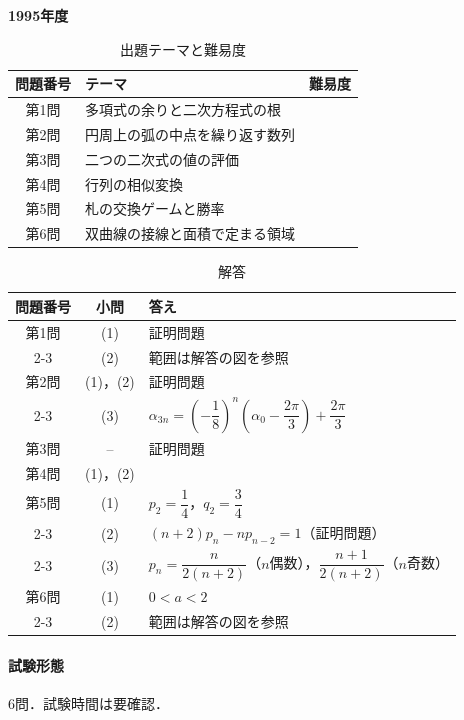 \documentclass[../../main.tex]{subfiles}
\begin{document}
\begin{center}
  {\fontsize{48pt}{58pt}\selectfont \textbf{1995}\normalsize\textbf{年度}}
\end{center}

\begin{table}[htb]
  \centering
  \caption{出題テーマと難易度}
  \begin{tabular}{|c|p{9cm}|c|}
    \hline
    \textbf{問題番号} & \textbf{テーマ} & \textbf{難易度} \\
    \hline
    第1問 & 多項式の余りと二次方程式の根 & \\
    \hline
    第2問 & 円周上の弧の中点を繰り返す数列 & \\
    \hline
    第3問 & 二つの二次式の値の評価 & \\
    \hline
    第4問 & 行列の相似変換 & \\
    \hline
    第5問 & 札の交換ゲームと勝率 & \\
    \hline
    第6問 & 双曲線の接線と面積で定まる領域 & \\
    \hline
  \end{tabular}
\end{table}

\begin{table}[htb]
  \centering
  \caption{解答}
  \renewcommand{\arraystretch}{1.4}
  \begin{tabular}{|c|c|p{9cm}|}
    \hline
    \textbf{問題番号} & \textbf{小問} & \textbf{答え} \\
    \hline
    第1問 & (1) & 証明問題 \\
    \cline{2-3}
    & (2) & 範囲は解答の図を参照 \\
    \hline
    第2問 & (1)，(2) & 証明問題 \\
    \cline{2-3}
    & (3) & $\alpha_{3n}=\left(-\dfrac{1}{8}\right)^n\left(\alpha_0-\dfrac{2\pi}{3}\right)+\dfrac{2\pi}{3}$ \\
    \hline
    第3問 & -- & 証明問題 \\
    \hline
    第4問 & (1)，(2) &  \\
    \hline
    第5問 & (1) & $p_2=\dfrac{1}{4}$，$q_2=\dfrac{3}{4}$ \\
    \cline{2-3}
    & (2) & $(n+2)p_n-np_{n-2}=1$（証明問題） \\
    \cline{2-3}
    & (3) & $p_n=\dfrac{n}{2(n+2)}$（$n$偶数），$\dfrac{n+1}{2(n+2)}$（$n$奇数） \\
    \hline
    第6問 & (1) & $0<a<2$ \\
    \cline{2-3}
    & (2) & 範囲は解答の図を参照 \\
    \hline
  \end{tabular}
\end{table}

\paragraph{試験形態}
6問．試験時間は要確認．
\end{document}
